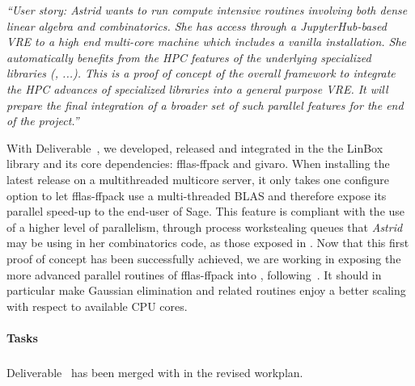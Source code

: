 \emph{“User story: Astrid wants to run compute intensive routines
    involving both dense linear algebra and combinatorics. She has
    access through a JupyterHub-based VRE to a high end multi-core
    machine which includes a vanilla \Sage installation. She
    automatically benefits from the HPC features of the underlying
    specialized libraries (\Linbox, ...). This is a proof of concept
    of the overall framework to integrate the HPC advances of
    specialized libraries into a general purpose VRE.
    It will prepare the final integration of a broader set of such
    parallel features for the end of the project.”}

With Deliverable~, we developed, released and integrated in the
\Sage the LinBox library and its core dependencies: fflas-ffpack and givaro.
When installing the latest \Sage release on a multithreaded multicore server, it
only takes one configure option to let fflas-ffpack use a multi-threaded BLAS
and therefore expose its parallel speed-up to the end-user of Sage. This feature
is compliant with the use of a higher level of parallelism, through process
workstealing queues that \textit{Astrid} may be using in her combinatorics code, as those
exposed in . Now that this first proof of concept has been
successfully achieved, we are working in exposing the more advanced parallel
routines of fflas-ffpack into \Sage, following~. It
should in particular make Gaussian elimination and related routines enjoy a
better scaling with respect to available CPU cores.

\paragraph{Tasks}

\subparagraph{}
Deliverable~ has been merged
 with  in the revised workplan.

